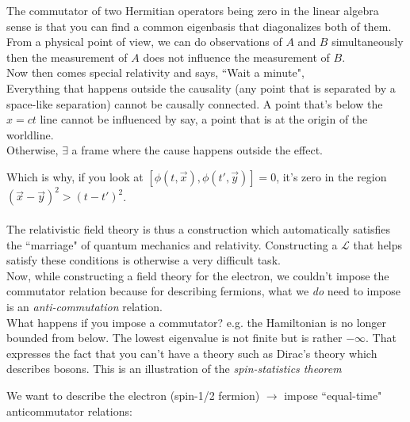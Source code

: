 \documentclass[11pt]{article}
\newcommand{\lag}{\mathcal{L}}
\begin{document}
 The commutator of two Hermitian operators being zero in the linear algebra sense is that you can find a common eigenbasis that diagonalizes both of them. From a physical point of view, we can do observations of $A$ and $B$ simultaneously then the measurement of $A$ does not influence the measurement of $B$.\\
	
	Now then comes special relativity and says, ``Wait a minute",\\
	Everything that happens outside the causality (any point that is separated by a space-like separation) cannot be causally connected. A point that's below the $x=ct$ line cannot be influenced by say, a point that is at the origin of the worldline.\\
	
	Otherwise, $\exists$ a frame where the cause happens outside the effect. 
	
	Which is why, if you look at $[\phi(t,\vec{x}), \phi(t', \vec{y})] = 0$, it's zero in the region $(\vec{x}-\vec{y})^2 > (t-t')^2$.\\
	
	\noindent {}\\
	
	The relativistic field theory is thus a construction which automatically satisfies the ``marriage" of quantum mechanics and relativity. Constructing a $\lag$ that helps satisfy these conditions is otherwise a very difficult task.\\
	
	
	Now, while constructing a field theory for the electron, we couldn't impose the commutator relation because for describing fermions, what we \textit{do} need to impose is an \textit{anti-commutation} relation.\\
	
	What happens if you impose a commutator? e.g. the Hamiltonian is no longer bounded from below. The lowest eigenvalue is not finite but is rather $-\infty$. That expresses the fact that you can't have a theory such as Dirac's theory which describes bosons. This is an illustration of the \textit{spin-statistics theorem}%
	
	
	We want to describe the electron (spin-1/2 fermion) $\rightarrow$ impose ``equal-time" anticommutator relations:
	
\end{document}
